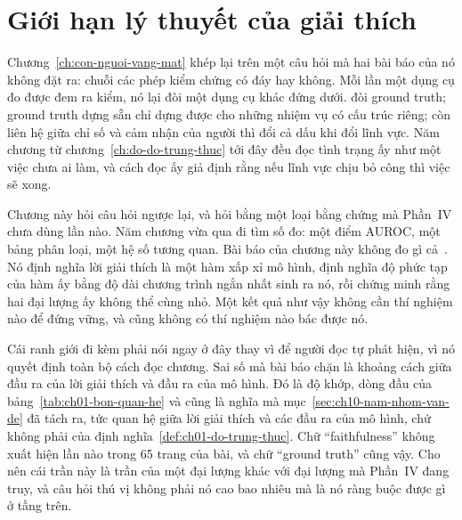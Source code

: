 %
%
\chapter{Giới hạn lý thuyết của giải thích}
\label{ch:gioi-han-ly-thuyet}

Chương~\ref{ch:con-nguoi-vang-mat} khép lại trên một câu hỏi mà hai bài báo của
nó không đặt ra: chuỗi các phép kiểm chứng có đáy hay không. Mỗi lần một dụng cụ
đo được đem ra kiểm, nó lại đòi một dụng cụ khác đứng dưới.  đòi ground truth; ground truth dựng sẵn chỉ dựng được
cho những nhiệm vụ có cấu trúc riêng; còn liên hệ giữa chỉ số và cảm nhận của
người thì đổi cả dấu khi đổi lĩnh vực. Năm chương từ
chương~\ref{ch:do-do-trung-thuc} tới đây đều đọc tình trạng ấy như một việc chưa
ai làm, và cách đọc ấy giả định rằng nếu lĩnh vực chịu bỏ công thì việc sẽ xong.

Chương này hỏi câu hỏi ngược lại, và hỏi bằng một loại bằng chứng mà Phần~IV
chưa dùng lần nào. Năm chương vừa qua đi tìm số đo: một điểm AUROC, một bảng
phân loại, một hệ số tương quan. Bài báo của chương này không đo gì
cả~\autocite{p26limits}. Nó định nghĩa lời giải thích là một hàm xấp xỉ mô
hình, định nghĩa độ phức tạp của hàm ấy bằng độ dài chương trình ngắn nhất sinh
ra nó, rồi chứng minh rằng hai đại lượng ấy không thể cùng nhỏ. Một kết quả như
vậy không cần thí nghiệm nào để đứng vững, và cũng không có thí nghiệm nào bác
được nó.

Cái ranh giới đi kèm phải nói ngay ở đây thay vì để người đọc tự phát hiện, vì
nó quyết định toàn bộ cách đọc chương. Sai số mà bài báo chặn là khoảng cách
giữa đầu ra của lời giải thích và đầu ra của mô hình. Đó là độ khớp, dòng đầu
của bảng~\ref{tab:ch01-bon-quan-he} và cũng là nghĩa mà
mục~\ref{sec:ch10-nam-nhom-van-de} đã tách ra, tức quan hệ giữa lời
giải thích và các đầu ra của mô hình, chứ không phải  của định
nghĩa~\ref{def:ch01-do-trung-thuc}. Chữ \enquote{faithfulness} không xuất hiện
lần nào trong 65 trang của bài, và chữ \enquote{ground truth} cũng vậy. Cho nên
cái trần này là trần của một đại lượng khác với đại lượng mà Phần~IV đang truy,
và câu hỏi thú vị không phải nó cao bao nhiêu mà là nó ràng buộc được gì ở tầng
trên.

